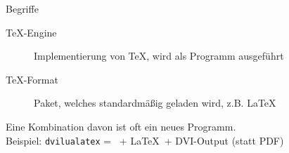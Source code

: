\begin{frame}{Begriffe}
  \Large
  \begin{description}
    \item[\TeX-Engine] Implementierung von \TeX, wird als Programm ausgeführt
    \item[\TeX-Format] Paket, welches standardmäßig geladen wird, z.B. \LaTeX
  \end{description}

  \vspace{10pt}
  Eine Kombination davon ist oft ein neues Programm.\\[10pt]
  Beispiel: \texttt{dvilualatex} = \LuaTeX\ + \LaTeX\ + DVI-Output (statt PDF)
\end{frame}

